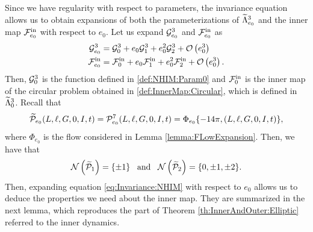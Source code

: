 Since we have regularity with respect to parameters, the invariance equation allows us
to obtain expansions of both the parameterizations of $\widetilde\Lambda_{e_0}^3$ and the inner map
$\mathcal{F}_{e_0}^{\mathrm{in}}$ with respect to $e_0$. Let us expand $\mathcal{G}^3_{e_0}$ and $\mathcal{F}^{\mathrm{in}}_{e_0}$ as
\begin{align}
  \mathcal{G}^3_{e_0}&=\mathcal{G}^3_0+e_0\mathcal{G}^3_1+e_0^2\mathcal{G}^3_2+\mathcal{O}\left(e_0^3\right)\label{def:ExpansionG}\\
  \mathcal{F}^{\mathrm{in}}_{e_0}&=\mathcal{F}^{\mathrm{in}}_0+e_0\mathcal{F}^{\mathrm{in}}_1+e_0^2\mathcal{F}^{\mathrm{in}}_2+\mathcal{O}\left(e_0^3\right).\label{def:ExpansionInnerMap}
\end{align}
Then, $\mathcal{G}^3_0$ is the function defined in \eqref{def:NHIM:Param0} and
$\mathcal{F}^{\mathrm{in}}_0$ is the inner map of the circular problem obtained in
\eqref{def:InnerMap:Circular}, which is defined in $\widetilde\Lambda^3_0$. Recall that
\begin{equation}\label{def:Harmonics:PoincareMap}
\widetilde{\mathcal{P}}_{e_0}(L,\ell,G,0,I,t)=\mathcal{P}_{e_0}^7(L,\ell,G,0,I,t)=\Phi_{e_0}\{-14\pi,(L,\ell,G,0,I,t)\},
\end{equation}
where $\Phi_{e_0}$ is the flow considered in Lemma \ref{lemma:FLowExpansion}. Then, we have that
\[
\mathcal{N}\left(\widetilde{\mathcal{P}}_1\right)=\{\pm 1\}\,\,\,\text{ and }\,\,\,\mathcal{N}\left(\widetilde{\mathcal{P}}_2\right)=\{0,\pm 1,\pm 2\}.
\]
Then, expanding equation \eqref{eq:Invariance:NHIM} with respect to $e_0$ allows us to deduce the properties we need about the inner map. They are summarized in the next lemma, which reproduces the part of Theorem \ref{th:InnerAndOuter:Elliptic} referred to the inner dynamics. 

